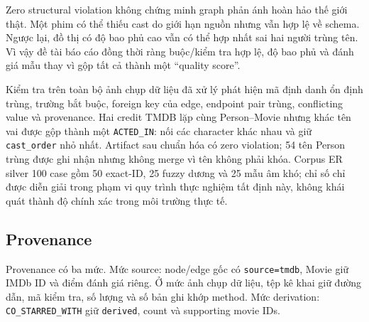 Zero structural violation không chứng minh graph phản ánh hoàn hảo thế giới thật.
Một phim có thể thiếu cast do giới hạn nguồn nhưng vẫn hợp lệ về schema. Ngược
lại, đồ thị có độ bao phủ cao vẫn có thể hợp nhất sai hai người trùng tên. Vì vậy đề tài
báo cáo đồng thời ràng buộc/kiểm tra hợp lệ, độ bao phủ và đánh giá mẫu thay vì gộp
tất cả thành một “quality score”.

Kiểm tra trên toàn bộ ảnh chụp dữ liệu đã xử lý phát hiện mã định danh ổn định
trùng, trường bắt buộc,
foreign key của edge, endpoint pair trùng, conflicting value và provenance. Hai
credit TMDB lặp cùng Person–Movie nhưng khác tên vai được gộp thành một
\texttt{ACTED\_IN}: nối các character khác nhau và giữ \texttt{cast\_order} nhỏ nhất. Artifact
sau chuẩn hóa có zero violation; 54 tên Person trùng được ghi nhận nhưng không
merge vì tên không phải khóa. Corpus ER silver 100 case gồm 50 exact-ID, 25 fuzzy
dương và 25 mẫu âm khó; chỉ số chỉ được diễn giải trong phạm vi quy trình thực
nghiệm tất định này, không khái quát thành độ chính xác trong môi trường thực tế.

\subsection{Provenance}

Provenance có ba mức. Mức source: node/edge gốc có \texttt{source=tmdb}, Movie giữ IMDb
ID và điểm đánh giá riêng. Ở mức ảnh chụp dữ liệu, tệp kê khai giữ đường dẫn, mã
kiểm tra, số lượng và số bản ghi khớp
method. Mức derivation: \texttt{CO\_STARRED\_WITH} giữ \texttt{derived}, count và supporting
movie IDs.
